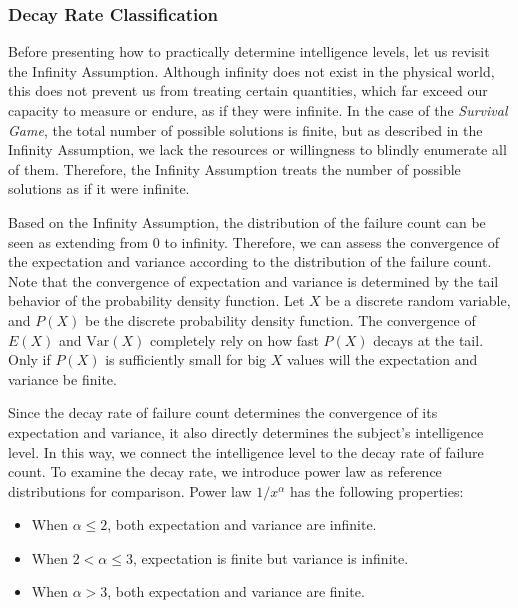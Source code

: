 \subsubsection{Decay Rate Classification}
\label{sec:decay_rate_classification}

Before presenting how to practically determine intelligence levels, let us revisit the Infinity Assumption.
Although infinity does not exist in the physical world, this does not prevent us from treating certain quantities, which far exceed our capacity to measure or endure, as if they were infinite. 
In the case of the \textit{Survival Game}, the total number of possible solutions is finite, but as described in the Infinity Assumption, we lack the resources or willingness to blindly enumerate all of them. Therefore, the Infinity Assumption treats the number of possible solutions as if it were infinite. 

Based on the Infinity Assumption, the distribution of the failure count can be seen as extending from 0 to infinity. Therefore, we can assess the convergence of the expectation and variance according to the distribution of the failure count.
Note that the convergence of expectation and variance is determined by the tail behavior of the probability density function. Let $X$ be a discrete random variable, and \( P(X) \) be the discrete probability density function. The convergence of \( E(X) \) and \( \text{Var}(X) \) completely rely on how fast \( P(X) \) decays at the tail. Only if \( P(X) \) is sufficiently small for big \( X \) values will the expectation and variance be finite.

Since the decay rate of failure count determines the convergence of its expectation and variance, it also directly determines the subject's intelligence level. In this way, we connect the intelligence level to the decay rate of failure count.
To examine the decay rate, we introduce power law as reference distributions for comparison. Power law \( 1/x^\alpha \) has the following properties:

\begin{itemize}
    \item When \( \alpha \leq 2 \), both expectation and variance are infinite.
    \item When \( 2 < \alpha \leq 3 \), expectation is finite but variance is infinite.
    \item When \( \alpha > 3 \), both expectation and variance are finite.
\end{itemize}

